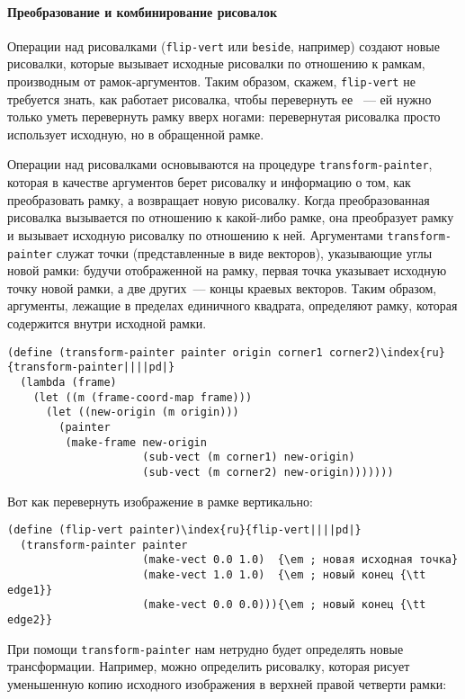 \paragraph{Преобразование и комбинирование рисовалок}


Операции над рисовалками ({\tt flip-vert} или
{\tt beside}, например) создают новые рисовалки, которые
вызывает исходные рисовалки по отношению к рамкам, производным от
рамок-аргументов. Таким образом, скажем, {\tt flip-vert} не
требуется знать, как работает рисовалка, чтобы перевернуть ее ~--- ей
нужно только уметь перевернуть рамку вверх ногами: перевернутая
рисовалка просто использует исходную, но в обращенной рамке.

Операции над рисовалками основываются на процедуре
{\tt trans\-form-pain\-ter}, которая в качестве аргументов берет
рисовалку и информацию о том, как преобразовать рамку, а возвращает
новую рисовалку.  Когда преобразованная рисовалка вызывается по
отношению к какой-либо рамке, она преобразует рамку и вызывает
исходную рисовалку по отношению к ней.  Аргументами
{\tt transform-painter} служат точки (представленные в виде
векторов), указывающие углы новой рамки: будучи отображенной на рамку,
первая точка указывает исходную точку новой рамки, а две других~--- концы
краевых векторов.  Таким образом, аргументы, лежащие в пределах
единичного квадрата, определяют рамку, которая содержится внутри
исходной рамки.

\begin{Verbatim}[fontsize=\small]
(define (transform-painter painter origin corner1 corner2)\index{ru}{transform-painter||||pd|}
  (lambda (frame)
    (let ((m (frame-coord-map frame)))
      (let ((new-origin (m origin)))
        (painter
         (make-frame new-origin
                     (sub-vect (m corner1) new-origin)
                     (sub-vect (m corner2) new-origin)))))))
\end{Verbatim}

Вот как перевернуть изображение в рамке вертикально:

\begin{Verbatim}[fontsize=\small]
(define (flip-vert painter)\index{ru}{flip-vert||||pd|}
  (transform-painter painter
                     (make-vect 0.0 1.0)  {\em ; новая исходная точка}
                     (make-vect 1.0 1.0)  {\em ; новый конец {\tt edge1}}
                     (make-vect 0.0 0.0))){\em ; новый конец {\tt edge2}}
\end{Verbatim}
При помощи {\tt transform-painter} нам нетрудно будет определять
новые тран\-с\-формации.  Например, можно определить рисовалку, которая
рисует уменьшенную копию исходного изображения в верхней правой
четверти рамки:

